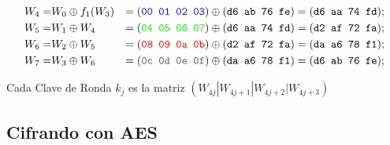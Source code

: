 \documentclass[10pt,t]{beamer}
\begin{document}
\begin{frame}
{        \begin{align*}
            W_4 =& W_0 \oplus f_1(W_3) &= (\textcolor{azul}{\texttt{00 01 02 03}}) \oplus (\texttt{d6 ab 76 fe}) = (\texttt{d6 aa 74 fd});\\
            W_5 =& W_1  \oplus W_4     &=(\textcolor{verde}{\texttt{04 05 06 07}}) \oplus (\texttt{d6 aa 74 fd}) = (\texttt{d2 af 72 fa});\\
            W_6 =& W_2  \oplus W_5    &= (\textcolor{rojo}{\texttt{08 09 0a 0b}}) \oplus (\texttt{d2 af 72 fa}) = (\texttt{da a6 78 f1});\\
            W_7 =& W_3  \oplus W_6    &= (\textcolor{gris}{\texttt{0c 0d 0e 0f}}) \oplus (\texttt{da a6 78 f1}) = (\texttt{d6 ab 76 fe});\\
        \end{align*}

        Cada Clave de Ronda $k_j$ es la matriz $(W_{4j} | W_{4j+1} | W_{4j+2} | W_{4j+3})$
    }
\end{frame}


\subsection{Cifrando con AES}
\end{document}

